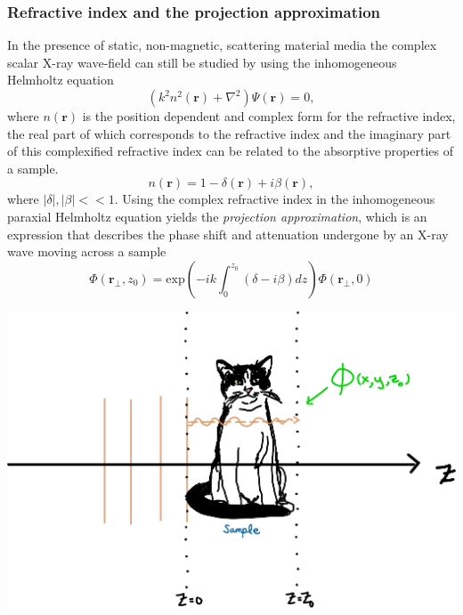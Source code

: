 \documentclass[10pt, a4paper, singlespacing]{report}
\newenvironment{Figure}
    {\par\medskip\noindent\minipage{\linewidth}}
    {\endminipage\par\medskip}
\begin{document}
\subsubsection{Refractive index and the projection approximation}\label{PA}
In the presence of static, non-magnetic, scattering material media the complex scalar X-ray wave-field can still be studied by using the inhomogeneous Helmholtz equation 
\begin{equation}\label{eq:10}
\left ( k^2 n^2 (\mathbf{r}) + \nabla^{2}  \right )\Psi(\mathbf{r}) = 0,
\end{equation}
where $n(\mathbf{r})$ is the position dependent and complex form for the refractive index, the real part of which corresponds to the refractive index and the imaginary part of this complexified refractive index can be related to the absorptive properties of a sample\cite{PagsTutes}.
\begin{equation}\label{eq:11}
n(\mathbf{r}) = 1 - \delta(\mathbf{r}) + i \beta(\mathbf{r}),
\end{equation}
where $|\delta|, |\beta| << 1$. Using the complex refractive index in the inhomogeneous paraxial Helmholtz equation yields the \textit{projection approximation}, which is an expression that describes the phase shift and attenuation undergone by an X-ray wave moving across a sample
\begin{equation}\label{eq:12}
\Phi(\mathbf{r}_{\perp}, z_0) = \mathrm{exp} \left ( -ik \int_{0}^{z_0}(\delta - i\beta)dz\right ) \Phi(\mathbf{r}_{\perp}, 0)
\end{equation}
\begin{Figure}
\centering
\includegraphics[width=0.6\linewidth]{projection_approximation.pdf}
\label{fig:1.2}
\end{Figure}
\end{document}
